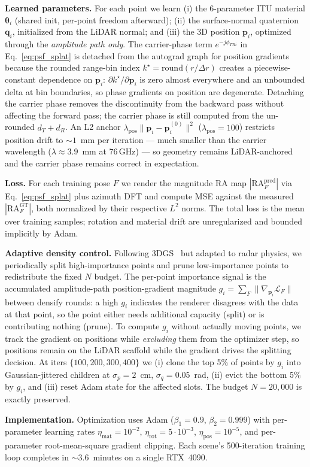\textbf{Learned parameters.} For each point we learn (i) the 6-parameter ITU material $\boldsymbol{\theta}_i$ (shared init, per-point freedom afterward); (ii) the surface-normal quaternion $\mathbf{q}_i$, initialized from the LiDAR normal; and (iii) the 3D position $\mathbf{p}_i$, optimized through the \emph{amplitude path only}. The carrier-phase term $e^{-j\phi_{T R i}}$ in Eq.~\eqref{eq:psf_splat} is detached from the autograd graph for position gradients because the rounded range-bin index $k^\star = \mathrm{round}(r/\Delta r)$ creates a piecewise-constant dependence on $\mathbf{p}_i$: $\partial k^\star / \partial \mathbf{p}_i$ is zero almost everywhere and an unbounded delta at bin boundaries, so phase gradients on position are degenerate. Detaching the carrier phase removes the discontinuity from the backward pass without affecting the forward pass; the carrier phase is still computed from the un-rounded $d_T + d_R$. An L2 anchor $\lambda_{\text{pos}}\|\mathbf{p}_i - \mathbf{p}_i^{(0)}\|^2$ ($\lambda_{\text{pos}}{=}100$) restricts position drift to ${\sim}1$~mm per iteration --- much smaller than the carrier wavelength ($\lambda \approx 3.9$~mm at 76\,GHz) --- so geometry remains LiDAR-anchored and the carrier phase remains correct in expectation.

\textbf{Loss.} For each training pose $F$ we render the magnitude RA map $|\mathrm{RA}_F^{\text{pred}}|$ via Eq.~\eqref{eq:psf_splat} plus azimuth DFT and compute MSE against the measured $|\mathrm{RA}_F^{\text{GT}}|$, both normalized by their respective $L^2$ norms. The total loss is the mean over training samples; rotation and material drift are unregularized and bounded implicitly by Adam.

\textbf{Adaptive density control.} Following 3DGS~\cite{3dgs} but adapted to radar physics, we periodically split high-importance points and prune low-importance points to redistribute the fixed $N$ budget. The per-point importance signal is the accumulated amplitude-path position-gradient magnitude $g_i = \sum_F \|\nabla_{\mathbf{p}_i} \mathcal{L}_F\|$ between densify rounds: a high $g_i$ indicates the renderer disagrees with the data at that point, so the point either needs additional capacity (split) or is contributing nothing (prune). To compute $g_i$ without actually moving points, we track the gradient on positions while \emph{excluding} them from the optimizer step, so positions remain on the LiDAR scaffold while the gradient drives the splitting decision. At iters $\{100, 200, 300, 400\}$ we (i) clone the top 5\% of points by $g_i$ into Gaussian-jittered children at $\sigma_p = 2$~cm, $\sigma_q = 0.05$~rad, (ii) evict the bottom 5\% by $g_i$, and (iii) reset Adam state for the affected slots. The budget $N{=}20{,}000$ is exactly preserved.

\textbf{Implementation.} Optimization uses Adam ($\beta_1{=}0.9$, $\beta_2{=}0.999$) with per-parameter learning rates $\eta_{\text{mat}}{=}10^{-2}$, $\eta_{\text{rot}}{=}5\!\cdot\!10^{-3}$, $\eta_{\text{pos}}{=}10^{-5}$, and per-parameter root-mean-square gradient clipping. Each scene's 500-iteration training loop completes in ${\sim}3.6$~minutes on a single RTX~4090.
